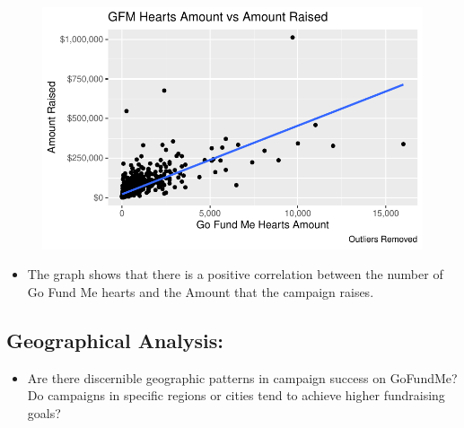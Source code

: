 \documentclass[
  letterpaper,
  DIV=11,
  numbers=noendperiod]{scrartcl}
\providecommand{\tightlist}{%
  \setlength{\itemsep}{0pt}\setlength{\parskip}{0pt}}\usepackage{longtable,booktabs,array}
\begin{document}
\begin{figure}[H]

{\centering \includegraphics{gfm_data_analysis_files/figure-pdf/social-media-analysis-4-1.pdf}

}

\end{figure}

\begin{itemize}
\tightlist
\item
  The graph shows that there is a positive correlation between the
  number of Go Fund Me hearts and the Amount that the campaign raises.
\end{itemize}

\hypertarget{geographical-analysis}{%
\subsection{Geographical Analysis:}\label{geographical-analysis}}

\begin{itemize}
\tightlist
\item
  Are there discernible geographic patterns in campaign success on
  GoFundMe? Do campaigns in specific regions or cities tend to achieve
  higher fundraising goals?
\end{itemize}
\end{document}
